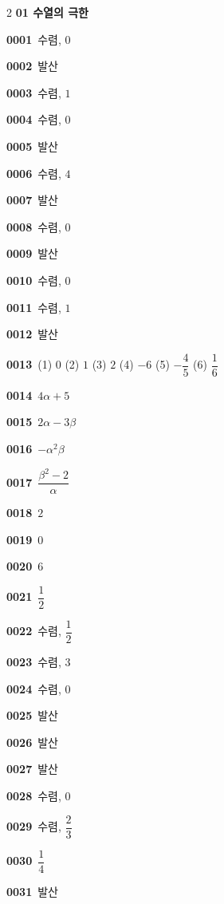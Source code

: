 \documentclass[10pt,a4paper]{article}
\begin{document}
\begin{multicols}{2}\small
\noindent\textbf{01 수열의 극한}\par\smallskip
\noindent\textbf{0001}\ 수렴, $0$\par
\noindent\textbf{0002}\ 발산\par
\noindent\textbf{0003}\ 수렴, $1$\par
\noindent\textbf{0004}\ 수렴, $0$\par
\noindent\textbf{0005}\ 발산\par
\noindent\textbf{0006}\ 수렴, $4$\par
\noindent\textbf{0007}\ 발산\par
\noindent\textbf{0008}\ 수렴, $0$\par
\noindent\textbf{0009}\ 발산\par
\noindent\textbf{0010}\ 수렴, $0$\par
\noindent\textbf{0011}\ 수렴, $1$\par
\noindent\textbf{0012}\ 발산\par
\noindent\textbf{0013}\ (1) $0$ (2) $1$ (3) $2$ (4) $-6$ (5) $-\dfrac{4}{5}$ (6) $\dfrac{1}{6}$\par
\noindent\textbf{0014}\ $4\alpha+5$\par
\noindent\textbf{0015}\ $2\alpha-3\beta$\par
\noindent\textbf{0016}\ $-\alpha^2\beta$\par
\noindent\textbf{0017}\ $\dfrac{\beta^2-2}{\alpha}$\par
\noindent\textbf{0018}\ $2$\par
\noindent\textbf{0019}\ $0$\par
\noindent\textbf{0020}\ $6$\par
\noindent\textbf{0021}\ $\dfrac{1}{2}$\par
\noindent\textbf{0022}\ 수렴, $\dfrac{1}{2}$\par
\noindent\textbf{0023}\ 수렴, $3$\par
\noindent\textbf{0024}\ 수렴, $0$\par
\noindent\textbf{0025}\ 발산\par
\noindent\textbf{0026}\ 발산\par
\noindent\textbf{0027}\ 발산\par
\noindent\textbf{0028}\ 수렴, $0$\par
\noindent\textbf{0029}\ 수렴, $\dfrac{2}{3}$\par
\noindent\textbf{0030}\ $\dfrac{1}{4}$\par
\noindent\textbf{0031}\ 발산\par

\end{multicols}
\end{document}
